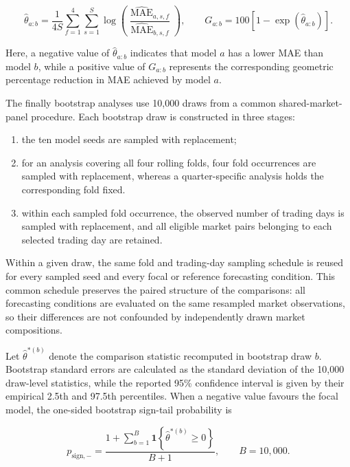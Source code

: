 \begin{equation}
\label{eq:ch3:observed_log_ratio_weighting}
\widehat{\theta}_{a:b}
=
\frac{1}{4S}
\sum_{f=1}^{4}
\sum_{s=1}^{S}
\log\!\left(
\frac{
\widehat{\operatorname{MAE}}_{a,s,f}
}{
\widehat{\operatorname{MAE}}_{b,s,f}
}
\right),
\qquad
G_{a:b}
=
100\left[1-\exp\!\left(\widehat{\theta}_{a:b}\right)\right].
\end{equation}

Here, a negative value of \(\widehat{\theta}_{a:b}\) indicates that model
\(a\) has a lower MAE than model \(b\), while a positive value of
\(G_{a:b}\) represents the corresponding geometric percentage reduction in
MAE achieved by model \(a\).

The finally bootstrap analyses use 10,000 draws from a common
shared-market-panel procedure. Each bootstrap draw is constructed in three stages:

\begin{enumerate}
    \item the ten model seeds are sampled with replacement;
    \item for an analysis covering all four rolling folds, four fold occurrences are sampled with replacement, whereas a quarter-specific analysis holds the corresponding fold fixed.
    \item within each sampled fold occurrence, the observed number of trading days is sampled with replacement, and all eligible market pairs belonging to each selected trading day are retained.
\end{enumerate}

Within a given draw, the same fold and trading-day sampling schedule is reused
for every sampled seed and every focal or reference forecasting condition.
This common schedule preserves the paired structure of the comparisons: all
forecasting conditions are evaluated on the same resampled market observations,
so their differences are not confounded by independently drawn market
compositions.

Let \(\widehat{\theta}^{*(b)}\) denote the comparison statistic recomputed in bootstrap draw \(b\). Bootstrap standard errors are calculated as the standard deviation of the 10,000 draw-level statistics, while the reported 95\% confidence interval is given by their empirical 2.5th and 97.5th percentiles. When a negative value favours the focal model, the one-sided bootstrap sign-tail probability is

\begin{equation}
p_{\mathrm{sign},-}
=
\frac{
1+\sum_{b=1}^{B}
\mathbf{1}\!\left\{
\widehat{\theta}^{*(b)}\geq0
\right\}
}{
B+1
},
\qquad
B=10{,}000.
\end{equation}

